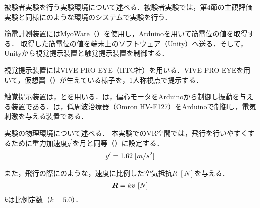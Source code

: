 \begin{small}




       

        被験者実験を行う実験環境について述べる．被験者実験では，第4節の主観評価実験と同様にのような環境のシステムで実験を行う．

        筋電計測装置にはMyoWare（）を使用し，Arduinoを用いて筋電位の値を取得する．
        取得した筋電位の値を端末上のソフトウェア（Unity）へ送る．そして，Unityから視覚提示装置と触覚提示装置を制御する．

        視覚提示装置にはVIVE PRO EYE（HTC社）を用いる．VIVE PRO EYEを用いて，仮想翼（）が生えている様子を，1人称視点で提示する．




        触覚提示装置は，とを用いる．は，偏心モータをArduinoから制御し振動を与える装置である．は，低周波治療器（Omron HV-F127）をArduinoで制御し，電気刺激を与える装置である．

        実験の物理環境について述べる．
        本実験でのVR空間では，飛行を行いやすくするために重力加速度$g^{\prime}$を月と同等（）に設定する．
        \begin{eqnarray}
                \equlabel{gravity}
                g^{\prime}=1.62\;[m/s^{2}]
        \end{eqnarray}

        また，飛行の際にのような，速度に比例した空気抵抗$R\;[N]$を与える．
        \begin{eqnarray}
                \equlabel{air_resistance}
                \bm{R}=k\bm{v} \;[N]
        \end{eqnarray}
        $k$は比例定数（$k=5.0$）．


\end{small}
